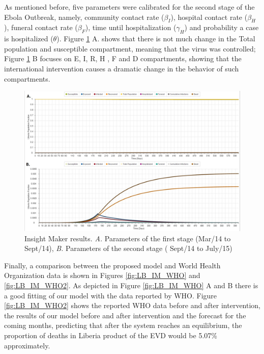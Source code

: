 \noindent As mentioned before, five parameters were calibrated for the second stage of the Ebola Outbreak, namely, community contact rate ($\beta_I$), hospital contact rate ($\beta_H$), funeral contact rate ($\beta_F$), time until hospitalization ($\gamma_H$) and probability a case is hospitalized ($\theta$). Figure \ref{fig:LB_IM_In} A. shows that there is not much change in the Total population and susceptible compartment, meaning that the virus was controlled;  Figure \ref{fig:LB_IM_In} B focuses on E, I, R, H , F and D compartments, showing that the international intervention causes a dramatic change in the behavior of such compartments.

\begin{figure}[!h]
  \centering
  \includegraphics[width=1\textwidth]{LB_Int3_SD_IM}
  \caption{ Insight Maker results. \textit{A.} Parameters of the first stage (Mar/14 to Sept/14), \textit{B.} Parameters of the second stage ( Sept/14 to July/15)}
\label{fig:LB_IM_In} 
\end{figure}



\noindent Finally, a comparison between the proposed model and World Health Organization data is shown in Figures \ref{fig:LB_IM_WHO} and \ref{fig:LB_IM_WHO2}. As depicted in Figure \ref{fig:LB_IM_WHO} A and B there is a good fitting of our model with the data reported by WHO. Figure \ref{fig:LB_IM_WHO2} shows  the reported WHO data before and after intervention, the results of our model before and after intervention and the forecast for the coming months, predicting that after the system reaches an equilibrium, the proportion of deaths in Liberia product of the EVD would be 5.07\% approximately.


